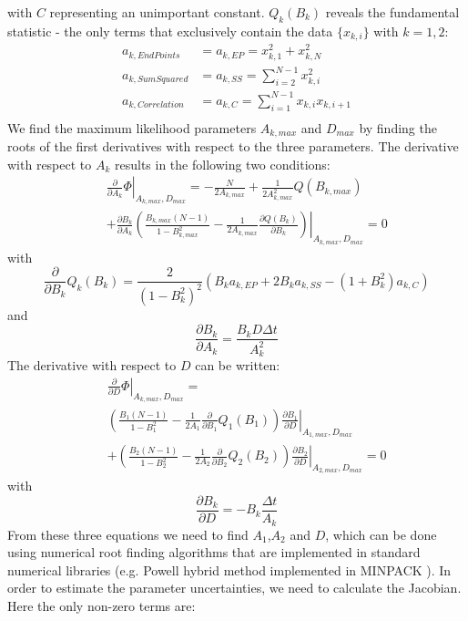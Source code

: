 \documentclass[%
 reprint,
 amsmath,amssymb,
 aps,
]{revtex4-1}
\begin{document}
with $C$ representing an unimportant constant. $Q_{k}(B_{k})$ reveals the fundamental statistic - the only terms that exclusively contain the data $\{x_{k,i}\}$ with $k=1,2$:
\begin{equation}
	\begin{aligned}
		a_{k,EndPoints}&=a_{k,EP}=x_{k,1}^{2}+x_{k,N}^{2}\\
		a_{k,SumSquared}&=a_{k,SS}=\sum\limits_{i=2}^{N-1}x_{k,i}^{2}\\
		a_{k,Correlation}&=a_{k,C}=\sum\limits_{i=1}^{N-1}x_{k,i}x_{k,i+1}\\
	\end{aligned}
\end{equation}
We find the maximum likelihood parameters $A_{k,max}$ and $D_{max}$ by finding the roots of the first derivatives with respect to the three parameters.  The derivative with respect to $A_{k}$ results in the following two conditions:
\begin{eqnarray}\label{partialsigma}
	&&\left.\frac{\partial}{\partial A_{k}}\Phi\right|_{A_{k,max},D_{max}} = -\frac{N}{2A_{k,max}}
	+\frac{1}{2A_{k,max}^{2}}Q(B_{k,max})\\
	&&+\frac{\partial B_{k}}{\partial A_{k}}\left.\left(\frac{B_{k,max}(N-1)}{1-B_{k,max}^2}
	 -\frac{1}{2A_{k,max}}
	 \frac{\partial Q(B_{k})}{\partial B_{k}}
	 \right)\right|_{A_{k,max},D_{max}}=0
\end{eqnarray}
with
\begin{equation}
	\frac{\partial}{\partial B_{k}}Q_{k}(B_{k}) =  \frac{2}{(1-B_{k}^{2})^{2}}\left(B_{k}a_{k,EP}+2B_{k}a_{k,SS}-(1+B_{k}^{2})a_{k,C}\right)
\end{equation}
and
\begin{equation}
	\frac{\partial B_{k}}{\partial A_{k}} = \frac{B_{k}D\Delta t}{A_{k}^{2}}
\end{equation}
The derivative with respect to $D$ can be written:
\begin{eqnarray}\label{partiald}
	&&\left.\frac{\partial}{\partial D}\Phi\right|_{A_{k,max},D_{max}} =\\
	&&\left(\frac{B_{1}(N-1)}{1-B_{1}^{2}}
	-\frac{1}{2A_{1}}\frac{\partial}{\partial B_{1}}Q_{1}(B_{1})\right)\left.\frac{\partial B_{1}}{\partial D}\right|_{A_{1,max},D_{max}}\\
	&&+\left(\frac{B_{2}(N-1)}{1-B_{2}^{2}}
	-\frac{1}{2A_{2}}\frac{\partial}{\partial B_{2}}Q_{2}(B_{2})\right)\left.\frac{\partial B_{2}}{\partial D}\right|_{A_{2,max},D_{max}}=0
\end{eqnarray}
with
\begin{equation}
	\frac{\partial B_{k}}{\partial D} = -B_{k}\frac{\Delta t}{A_{k}}
\end{equation}
From these three equations we need to find $A_{1}$,$A_{2}$ and $D$, which can be done using numerical root finding algorithms that are implemented in standard numerical libraries (e.g. Powell hybrid method implemented in MINPACK \cite{osti_6997568}).  In order to estimate the parameter uncertainties, we need to calculate the Jacobian.  Here the only non-zero terms are: 
\end{document}
